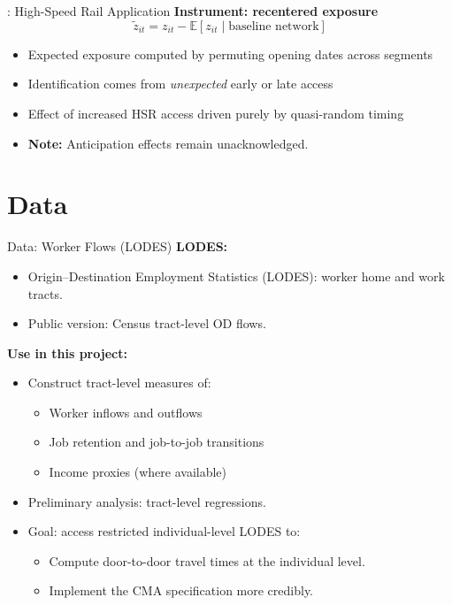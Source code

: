 \documentclass{beamer}
\begin{document}
\begin{frame}{\cite{borusyak_nonrandom_2023}: High-Speed Rail Application}
\textbf{Instrument: recentered exposure}
\[
\tilde{z}_{it} = z_{it} - \mathbb{E}[z_{it} \mid \text{baseline network}]
\]

\begin{itemize}
    \item Expected exposure computed by permuting opening dates across segments
    \item Identification comes from \emph{unexpected} early or late access
    \item Effect of increased HSR access driven purely by quasi-random timing
    \item \textbf{Note:} Anticipation effects remain unacknowledged.
\end{itemize}
\end{frame}

\section{Data}
\begin{frame}{Data: Worker Flows (LODES)}
\small
\textbf{LODES:}
\begin{itemize}
    \item Origin–Destination Employment Statistics (LODES): worker home and work tracts.
    \item Public version: Census tract-level OD flows.
\end{itemize}

\medskip
\textbf{Use in this project:}
\begin{itemize}
    \item Construct tract-level measures of:
    \begin{itemize}
        \item Worker inflows and outflows
        \item Job retention and job-to-job transitions
        \item Income proxies (where available)
    \end{itemize}
    \item Preliminary analysis: tract-level regressions.
    \item Goal: access restricted individual-level LODES to:
    \begin{itemize}
        \item Compute door-to-door travel times at the individual level.
        \item Implement the CMA specification more credibly.
    \end{itemize}
\end{itemize}
\end{frame}
\end{document}
